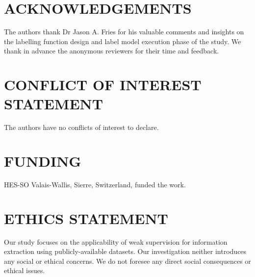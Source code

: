 \documentclass[10.7pt,]{article}
\begin{document}
\section{ACKNOWLEDGEMENTS}\label{acknowledgements}
%
The authors thank Dr Jason A. Fries for his valuable comments and insights on the labelling function design and label model execution phase of the study.
We thank in advance the anonymous reviewers for their time and feedback.
%
\section{CONFLICT OF INTEREST STATEMENT}\label{conflictinterest}
%
The authors have no conflicts of interest to declare. 
%
\section{FUNDING}\label{funding}
%
HES-SO Valais-Wallis, Sierre, Switzerland, funded the work.
%
\section{ETHICS STATEMENT}\label{ethic}
%
Our study focuses on the applicability of weak supervision for information extraction using publicly-available datasets.
Our investigation neither introduces any social or ethical concerns.
We do not foresee any direct social consequences or ethical issues.
%
\printbibliography
%
%
%
%
%
\end{document}
